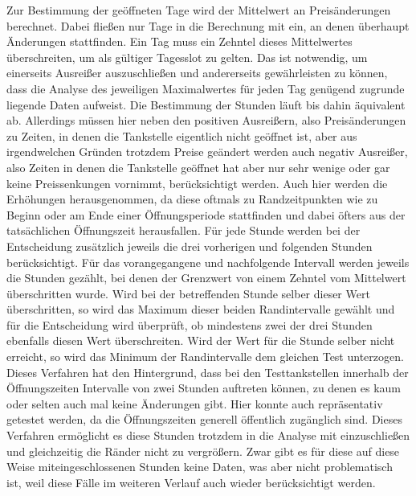 Zur Bestimmung der geöffneten Tage wird der Mittelwert an Preisänderungen berechnet. Dabei fließen nur Tage in die Berechnung mit ein, an denen überhaupt Änderungen stattfinden. Ein Tag muss ein Zehntel dieses Mittelwertes überschreiten, um als gültiger Tagesslot zu gelten. Das ist notwendig, um einerseits Ausreißer auszuschließen und andererseits gewährleisten zu können, dass die Analyse des jeweiligen Maximalwertes für jeden Tag genügend zugrunde liegende Daten aufweist. Die Bestimmung der Stunden läuft bis dahin äquivalent ab. Allerdings müssen hier neben den positiven Ausreißern, also Preisänderungen zu Zeiten, in denen die Tankstelle eigentlich nicht geöffnet ist, aber aus irgendwelchen Gründen trotzdem Preise geändert werden auch negativ Ausreißer, also Zeiten in denen die Tankstelle geöffnet hat aber nur sehr wenige oder gar keine Preissenkungen vornimmt, berücksichtigt werden. Auch hier werden die Erhöhungen herausgenommen, da diese oftmals zu Randzeitpunkten wie zu Beginn oder am Ende einer Öffnungsperiode stattfinden und dabei öfters aus der tatsächlichen Öffnungszeit herausfallen. Für jede Stunde werden bei der Entscheidung zusätzlich jeweils die drei vorherigen und folgenden Stunden berücksichtigt. Für das vorangegangene und nachfolgende Intervall werden jeweils die Stunden gezählt, bei denen der Grenzwert von einem Zehntel vom Mittelwert überschritten wurde. Wird bei der betreffenden Stunde selber dieser Wert überschritten, so wird das Maximum dieser beiden Randintervalle gewählt und für die Entscheidung wird überprüft, ob mindestens zwei der drei Stunden ebenfalls diesen Wert überschreiten. Wird der Wert für die Stunde selber nicht erreicht, so wird das Minimum der Randintervalle dem gleichen Test unterzogen. Dieses Verfahren hat den Hintergrund, dass bei den Testtankstellen innerhalb der Öffnungszeiten Intervalle von zwei Stunden auftreten können, zu denen es kaum oder selten auch mal keine Änderungen gibt. Hier konnte auch repräsentativ getestet werden, da die Öffnungszeiten generell öffentlich zugänglich sind. Dieses Verfahren ermöglicht es diese Stunden trotzdem in die Analyse mit einzuschließen und gleichzeitig die Ränder nicht zu vergrößern. Zwar gibt es für diese auf diese Weise miteingeschlossenen Stunden keine Daten, was aber nicht problematisch ist, weil diese Fälle im weiteren Verlauf auch wieder berücksichtigt werden.

